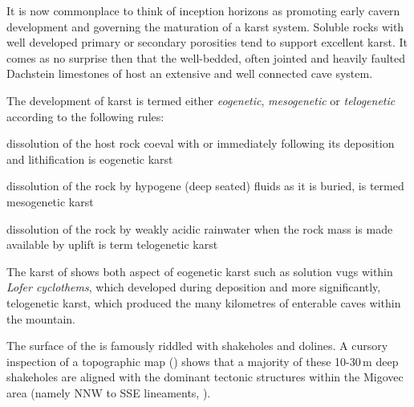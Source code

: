 It is now commonplace to think of inception horizons \citep{lowe1997carbonate} as promoting early cavern development and governing the maturation of a karst system. Soluble rocks with well developed primary or secondary porosities tend to support excellent karst. It comes as no surprise then that the well-bedded, often jointed and heavily faulted Dachstein limestones of  host an extensive and well connected cave system.

The development of karst is termed either \emph{eogenetic}, \emph{mesogenetic} or \emph{telogenetic} according to the following rules:
\begin{citemize}
\item dissolution of the host rock coeval with or immediately following its deposition and lithification is eogenetic karst 
\item dissolution of the rock by hypogene (deep seated) fluids as it is buried, is termed mesogenetic karst
\item dissolution of the rock by weakly acidic rainwater when the rock mass is made available by uplift is term telogenetic karst
\end{citemize}

The karst of  shows both aspect of eogenetic karst such as solution vugs within \emph{Lofer cyclothems}, which developed during deposition and more significantly, telogenetic karst, which produced the many kilometres of enterable caves within the mountain.

The surface of the  is famously riddled with shakeholes and dolines. A cursory inspection of a topographic map () shows that a majority of these 10-30\,m deep shakeholes are aligned with the dominant tectonic structures within the Migovec area (namely NNW to SSE lineaments, ). 

